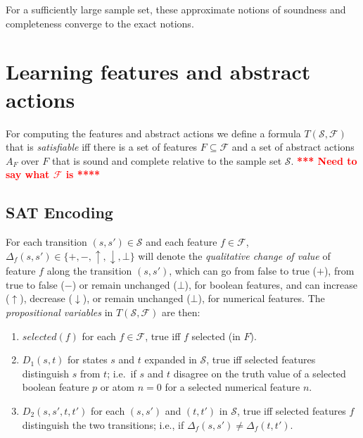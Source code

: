\documentclass[letterpaper]{article} %
\newcommand{\Omit}[1]{}
\newcommand{\F}{\mathcal{F}}
\renewcommand{\S}{\mathcal{S}}
\begin{document}
For a sufficiently large sample set, these approximate notions of soundness and completeness
converge to the exact notions. 


\section{Learning  features and  abstract actions}

For computing the features and abstract actions we define a formula
$T(\S,\F)$ that is \emph{satisfiable} iff there is a set of
features $F \subseteq \F$ and a set of abstract actions $A_F$
over $F$ that is sound and complete relative to the sample set
$\S$.
\textcolor{red}{\bf **** Need to say what $\F$ is ****}

\Omit{The  sets  $F$ and $A_F$ can then be read off from any satisfying
  assignment. Later we will add weights to so me of the clauses to establish
  a preference over these assignments (e.g., for  minimizing $|F|$).
}


\subsection{SAT Encoding}

For each transition  $(s, s') \in \S$ and each feature $f \in \F$,
$\Delta_f(s, s') \in \{+, -, \uparrow, \downarrow, \bot\}$ will denote the
\emph{qualitative change of value} of feature $f$ along the transition $(s, s')$,
which can go from false to true ($+$), from true to false ($-$) or remain
unchanged ($\bot$), for boolean features, and can increase ($\uparrow$),
decrease ($\downarrow$), or remain unchanged ($\bot$), for numerical features.
The \emph{propositional variables} in $T(\S,\F)$ are then:
\begin{enumerate}[{\small$\bullet$}]
  \item $selected(f)$ for each $f \in \F$, true iff $f$ selected (in $F$).
  \item $D_1(s,t)$ for states $s$ and $t$ expanded in $\S$,  true iff
    selected features distinguish $s$ from $t$; i.e.\ if $s$ and $t$ disagree
    on the truth value of a selected boolean feature $p$ or atom $n=0$ for a
    selected numerical feature $n$.
  \item $D_2(s, s', t, t')$ for each $(s, s')$ and $(t, t')$ in $\S$,
    true iff selected features $f$ distinguish the two transitions; i.e., if
    $\Delta_f(s, s')\not=\Delta_f(t,t')$. 
\end{enumerate}
\end{document}
